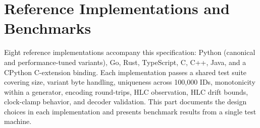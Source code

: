 \section{Reference Implementations and Benchmarks}
\label{sec:implementations}

Eight reference implementations accompany this specification: Python (canonical and performance-tuned variants), Go, Rust, TypeScript, C, C++, Java, and a CPython C-extension binding. Each implementation passes a shared test suite covering size, variant byte handling, uniqueness across 100{,}000 IDs, monotonicity within a generator, encoding round-trips, HLC observation, HLC drift bounds, clock-clamp behavior, and decoder validation. This part documents the design choices in each implementation and presents benchmark results from a single test machine.

